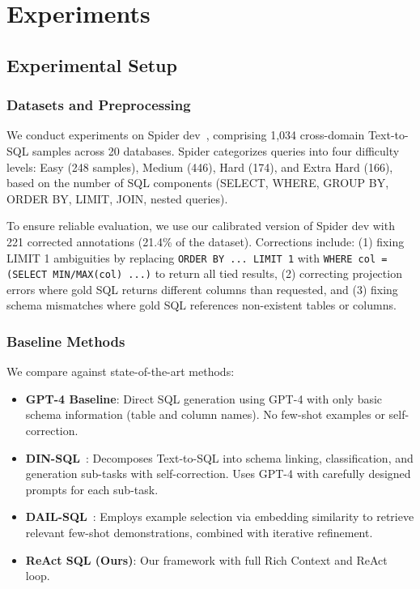 \section{Experiments}

\subsection{Experimental Setup}

\subsubsection{Datasets and Preprocessing}

We conduct experiments on Spider dev~\cite{yu2018spider}, comprising 1,034 cross-domain Text-to-SQL samples across 20 databases. Spider categorizes queries into four difficulty levels: Easy (248 samples), Medium (446), Hard (174), and Extra Hard (166), based on the number of SQL components (SELECT, WHERE, GROUP BY, ORDER BY, LIMIT, JOIN, nested queries).

To ensure reliable evaluation, we use our calibrated version of Spider dev with 221 corrected annotations (21.4\% of the dataset). Corrections include: (1) fixing LIMIT 1 ambiguities by replacing \texttt{ORDER BY ... LIMIT 1} with \texttt{WHERE col = (SELECT MIN/MAX(col) ...)} to return all tied results, (2) correcting projection errors where gold SQL returns different columns than requested, and (3) fixing schema mismatches where gold SQL references non-existent tables or columns.

\subsubsection{Baseline Methods}

We compare against state-of-the-art methods:

\begin{itemize}
    \item \textbf{GPT-4 Baseline}: Direct SQL generation using GPT-4 with only basic schema information (table and column names). No few-shot examples or self-correction.
    
    \item \textbf{DIN-SQL}~\cite{pourreza2024dail}: Decomposes Text-to-SQL into schema linking, classification, and generation sub-tasks with self-correction. Uses GPT-4 with carefully designed prompts for each sub-task.
    
    \item \textbf{DAIL-SQL}~\cite{gao2024dail}: Employs example selection via embedding similarity to retrieve relevant few-shot demonstrations, combined with iterative refinement.
    
    \item \textbf{ReAct SQL (Ours)}: Our framework with full Rich Context and ReAct loop.
\end{itemize}

